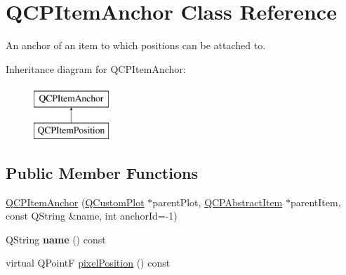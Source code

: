 \hypertarget{class_q_c_p_item_anchor}{}\section{Q\+C\+P\+Item\+Anchor Class Reference}
\label{class_q_c_p_item_anchor}


An anchor of an item to which positions can be attached to.  


Inheritance diagram for Q\+C\+P\+Item\+Anchor\+:\begin{figure}[H]
\begin{center}
\leavevmode
\includegraphics[height=2.000000cm]{class_q_c_p_item_anchor}
\end{center}
\end{figure}
\subsection*{Public Member Functions}
\begin{DoxyCompactItemize}
\item 
\mbox{\hyperlink{class_q_c_p_item_anchor_a32573023c6fa65b4496f1f995e5bfa5f}{Q\+C\+P\+Item\+Anchor}} (\mbox{\hyperlink{class_q_custom_plot}{Q\+Custom\+Plot}} $\ast$parent\+Plot, \mbox{\hyperlink{class_q_c_p_abstract_item}{Q\+C\+P\+Abstract\+Item}} $\ast$parent\+Item, const Q\+String \&name, int anchor\+Id=-\/1)
\item 
\mbox{\label{class_q_c_p_item_anchor_aad37cdf5a3f63428f61be739014e212e}} 
Q\+String {\bfseries name} () const
\item 
virtual Q\+PointF \mbox{\hyperlink{class_q_c_p_item_anchor_a06dcfb7220d26eee93eef56ae66582cb}{pixel\+Position}} () const
\end{DoxyCompactItemize}
